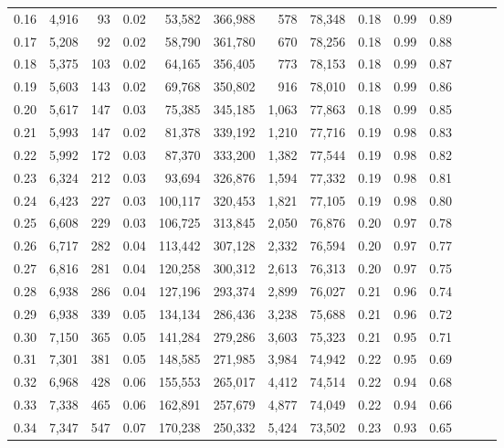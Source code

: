 \begin{tabular}{rrrrrrrrrrrrrr}
0.16 &  4,916 &     93 &  0.02 &   53,582 &  366,988 &     578 &  78,348 &  0.18 &  0.99 &      0.89 \\
0.17 &  5,208 &     92 &  0.02 &   58,790 &  361,780 &     670 &  78,256 &  0.18 &  0.99 &      0.88 \\
0.18 &  5,375 &    103 &  0.02 &   64,165 &  356,405 &     773 &  78,153 &  0.18 &  0.99 &      0.87 \\
0.19 &  5,603 &    143 &  0.02 &   69,768 &  350,802 &     916 &  78,010 &  0.18 &  0.99 &      0.86 \\
0.20 &  5,617 &    147 &  0.03 &   75,385 &  345,185 &   1,063 &  77,863 &  0.18 &  0.99 &      0.85 \\
0.21 &  5,993 &    147 &  0.02 &   81,378 &  339,192 &   1,210 &  77,716 &  0.19 &  0.98 &      0.83 \\
0.22 &  5,992 &    172 &  0.03 &   87,370 &  333,200 &   1,382 &  77,544 &  0.19 &  0.98 &      0.82 \\
0.23 &  6,324 &    212 &  0.03 &   93,694 &  326,876 &   1,594 &  77,332 &  0.19 &  0.98 &      0.81 \\
0.24 &  6,423 &    227 &  0.03 &  100,117 &  320,453 &   1,821 &  77,105 &  0.19 &  0.98 &      0.80 \\
0.25 &  6,608 &    229 &  0.03 &  106,725 &  313,845 &   2,050 &  76,876 &  0.20 &  0.97 &      0.78 \\
0.26 &  6,717 &    282 &  0.04 &  113,442 &  307,128 &   2,332 &  76,594 &  0.20 &  0.97 &      0.77 \\
0.27 &  6,816 &    281 &  0.04 &  120,258 &  300,312 &   2,613 &  76,313 &  0.20 &  0.97 &      0.75 \\
0.28 &  6,938 &    286 &  0.04 &  127,196 &  293,374 &   2,899 &  76,027 &  0.21 &  0.96 &      0.74 \\
0.29 &  6,938 &    339 &  0.05 &  134,134 &  286,436 &   3,238 &  75,688 &  0.21 &  0.96 &      0.72 \\
0.30 &  7,150 &    365 &  0.05 &  141,284 &  279,286 &   3,603 &  75,323 &  0.21 &  0.95 &      0.71 \\
0.31 &  7,301 &    381 &  0.05 &  148,585 &  271,985 &   3,984 &  74,942 &  0.22 &  0.95 &      0.69 \\
0.32 &  6,968 &    428 &  0.06 &  155,553 &  265,017 &   4,412 &  74,514 &  0.22 &  0.94 &      0.68 \\
0.33 &  7,338 &    465 &  0.06 &  162,891 &  257,679 &   4,877 &  74,049 &  0.22 &  0.94 &      0.66 \\
0.34 &  7,347 &    547 &  0.07 &  170,238 &  250,332 &   5,424 &  73,502 &  0.23 &  0.93 &      0.65 \\

\end{tabular}
